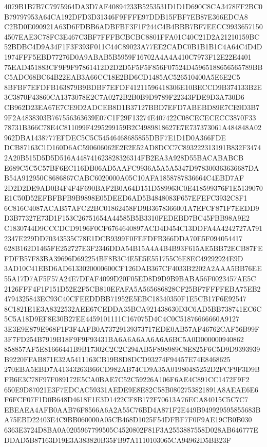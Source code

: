 \documentclass[UTF8,fontset=fandol,zihao=-4,a4paper]{ctexart}
\begin{document}
{{4079B1B7B7C7975964DA3D7AF40894233B5253531D1D1D690C8CA3478FF2BC0B79797953A64CA192DFD3D31346F9FFFE97DDB15FBF7EB87E366EDCA8
C2BD0E090921A63D6FDBB6ADBFBF3F1F244C4B4BBB7BF7EECC99336571504507EAE3C78FC3E467C3BF7FFFBCBCBC8801FFA01C40C21D2A21210159BC
52BDBC4D9A34F1F3F393F011C44C89023A77EE2CADC0B1B1B1C4A64C4D4D1974FFF5EBD77276D0A9ABAB5B5959F16702A4A4A410C7973F12E22E4401
75EAD451883CF9F9F97861412D2D2D5F5F5F856F07524D45965188656565789BBC5ADC68BC64B22EAB3A66CC18E2BD6CD1485AC526510400A5E6E2C5
8BFBF7EFDFB163879B9BDBF7EFDF41211596418306E10BECCD9B374133B2E3C3870F43860CA1373078E2C7A0272B2B0B9D9789F22343FDE9D3A730D6
CB962D23EA67E7CE9D2ADCEB8D1B37127BBD7EFD7ABEBD89E7CE9D3B79F2A4838303B767556363639E07C1F29F13274E407422C08CECECECC3870F33
78731B366C78E4C811099F4295299159B2C4989818627E7E737373061A484848A02962DBA1438777EFDEC5C5C54546468685855DBF7E1D1D0A366FDE
DCB87163C1D160D6AC590606062E2E2E52AD8DCC7C893222313191B832F34742A20B515D5D5D516A448741623828326314FB2EA3A928D55BACABABCB
E689C5C5C57BF6EC116DB06AD5AAFC9936A5A5A5347D978300363636687DAB54A912950C8686867CABC6020000A05C10AFA1858787836664C4EBD7AF
2D2D2DE9AD0B4F4F4F690BAF2B0A64D151D589963C0E418599376F1E5139070E1C50D52EFBFBFB9B9898E05DEED6AD5B4848083F657EFEFC3932C8F1
6C816C4087ACAB57AFC22BC01862458FD9B3678366001A7EFCF871F7EEDD9D3B77327E73D1F153C26751654A44585B5B3310FEDEBD7BC45FBB98A9E2
C1830744D9CCCDCD9196F0CF6764640897ACD4D454C13DDFA4A4242727A7912347E229DD70343535C78E1DCB9399F0FEFDFB366DDA70E5F094054417
628B162D1465FE252727E3F2346DDA54B15A4A4B4B93F615AE5BB72ECB87FEFDFB57F83BA39696D692254BF8B3C4E5E5E551755C6E8EC49292924E9D
3AD10C41EBD6AD6133020000600CF126DAB367CF4033B2202A2AAA5BB76EE55A17D7AF5F57A24E7DFAF4099D20F05ED8D9D9B9BABA56F0023457AE5C
2126FFF4F1F151D52E2F5CB810EFAFA5A565686828CF25BF7FFFFEBA75EB24794325843EC93C40CFEEDDBB71952E5EBC18340350F1E5CB17F6E92547
8C1821E1E3A8322532AEE67CEDDA35BCA921438630D3C6AD5BB738741EC6C5C5A18D9EF8E30B27EE4459101111C167075D4C4C0C51876666660A9127
3E3E9E879E968F1F3F4AFB0A73729139373717EDE0AB57AF46762CAF56B99F3F7FD254B7919B18F9F9F93431BA6A6A6AA6A6A6BC5A0D000000940862
858857AF5E81666441B9B17302C2C2C294AB5F898989C8E825F6C5D9D9393939B9220FFAB871E32A5411163CB19B8D8DCD93274F94457E74E8468625
270EBA5EBD7A41343263B66CD982AB74CD9A35A01980485252D2FCF9F3D9BFB6E3C78F97F089172E5CA0BAE7C52C59226A106F6AE4C891CC1472F9F2
650E9D87021E3F7EDCAC59331AEDE9E8E82C58B0802753821891A8AEAE6E6F6FCF07F1D0B648D4618F1E3D1422CF8B172F70613A76ECA84015C5C7C7
EBEAEA4AFB0AAB76F8566A6A2A55C76BD4A871F2E449B949929595855683BA75EBD22403E4C9BB060000A05CB468D1025F54DFBF7F0F9AE19CB0B030
6363E3724D8BA0A0205967799505C4520802F81F3A2553887558D028AB646777EDDAD5B87163D19E3A383820B35FB97A1110103065CA94962D5BB23F
}}
\end{document}
